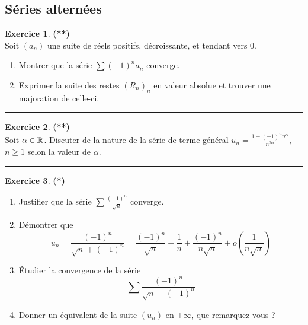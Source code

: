 \documentclass[a4paper,11pt]{article}
\theoremstyle{definition}
\newtheorem{exo}{Exercice} %
\newcommand{\disp}{\displaystyle}
\begin{document}
\begin{minipage}{1\linewidth}\begin{minipage}[t]{0.48\linewidth}\raggedright
		\subsection*{Séries alternées}
		
		\begin{exo}\textbf{(**)}\quad\\[0.2cm]%
		Soit $(a_n)$ une suite de réels positifs, décroissante, et tendant vers 0.
		
		\begin{enumerate}
			\item Montrer que la série $\sum (-1)^na_n$ converge.
			\item Exprimer la suite des restes $(R_n)_n$ en valeur absolue et trouver une majoration de celle-ci. 
		\end{enumerate}
			
			
			
			\centering\rule{1\linewidth}{0.6pt}\end{exo}
		
		\begin{exo}\textbf{(**)}\quad\\[0.2cm]
			Soit $\alpha\in\mathbb{R}$. Discuter de la nature de la série de terme général $\disp u_n=\frac{1+(-1)^nn^\alpha}{n^{2\alpha}}$, $n\geqslant1$ selon la valeur de $\alpha$.
			
			\centering\rule{1\linewidth}{0.6pt}\end{exo}
		
	\begin{exo}\textbf{(*)}\quad\\[0.2cm]
		\begin{enumerate}
			\item Justifier que la série $\disp \sum \frac{(-1)^n}{\sqrt n}$ converge.
			\item Démontrer que $$\displaystyle u_n = \frac{(-1)^n}{\sqrt n+(-1)^n}=\frac{(-1)^n}{\sqrt n}-\frac1n+\frac{(-1)^n}{n\sqrt
				n}+o\left(\frac 1{n\sqrt n}\right)$$
			\item \'Etudier la convergence de la série $$\displaystyle \sum \frac{(-1)^n}{\sqrt n+(-1)^n}$$
			\item Donner un équivalent de la suite $(u_n)$ en $+\infty$, que remarquez-vous ? 
		\end{enumerate}
		

\end{exo}
\end{minipage}
\end{minipage}
\end{document}
